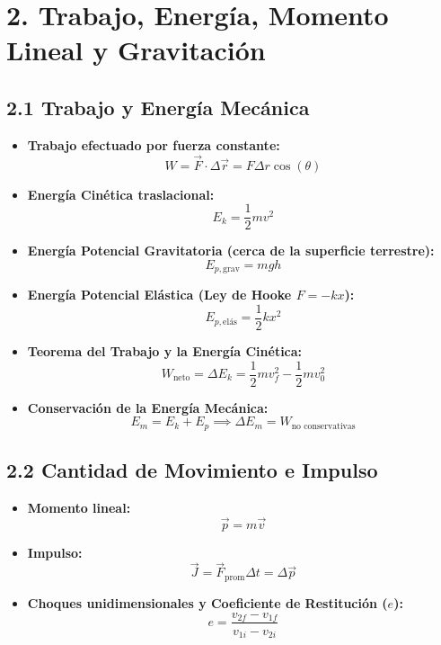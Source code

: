\documentclass[11pt,a4paper]{article}
\begin{document}
\section*{2. Trabajo, Energía, Momento Lineal y Gravitación}

\subsection*{2.1 Trabajo y Energía Mecánica}

\begin{itemize}
  \item \textbf{Trabajo efectuado por fuerza constante:}
  \[
    W = \vec{F} \cdot \Delta\vec{r} = F \Delta r \cos(\theta)
  \]
  \item \textbf{Energía Cinética traslacional:}
  \[
    E_k = \frac{1}{2} m v^2
  \]
  \item \textbf{Energía Potencial Gravitatoria (cerca de la superficie terrestre):}
  \[
    E_{p,\text{grav}} = m g h
  \]
  \item \textbf{Energía Potencial Elástica (Ley de Hooke $F = -kx$):}
  \[
    E_{p,\text{elás}} = \frac{1}{2} k x^2
  \]
  \item \textbf{Teorema del Trabajo y la Energía Cinética:}
  \[
    W_{\text{neto}} = \Delta E_k = \frac{1}{2} m v_f^2 - \frac{1}{2} m v_0^2
  \]
  \item \textbf{Conservación de la Energía Mecánica:}
  \[
    E_m = E_k + E_p \implies \Delta E_m = W_{\text{no conservativas}}
  \]
\end{itemize}

\subsection*{2.2 Cantidad de Movimiento e Impulso}

\begin{itemize}
  \item \textbf{Momento lineal:}
  \[
    \vec{p} = m \vec{v}
  \]
  \item \textbf{Impulso:}
  \[
    \vec{J} = \vec{F}_{\text{prom}} \Delta t = \Delta \vec{p}
  \]
  \item \textbf{Choques unidimensionales y Coeficiente de Restitución ($e$):}
  \[
    e = \frac{v_{2f} - v_{1f}}{v_{1i} - v_{2i}}
  \]
\end{itemize}
\end{document}
